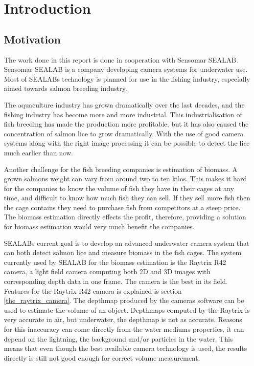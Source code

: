 \section{Introduction}\label{introduction}

\subsection{Motivation}\label{motivation}

The work done in this report is done in cooperation with Sensomar SEALAB.
Sensomar SEALAB is a company developing camera systems for underwater use. Most of SEALABs technology is planned for use in the fishing industry, especially aimed towards salmon breeding industry. 

The aquaculture industry has grown dramatically over the last decades, and the fishing industry has become more and more industrial. This industrialisation of fish breeding has made the production more profitable, but it has also caused the concentration of salmon lice to grow dramatically. With the use of good camera systems along with the right image processing it can be possible to detect the lice much earlier than now. 

Another challenge for the fish breeding companies is estimation of biomass. A grown salmons weight can vary from around two to ten kilos. This makes it hard for the companies to know the volume of fish they have in their cages at any time, and difficult to know how much fish they can sell. If they sell more fish then the cage contains they need to purchase fish from competitors at a steep price. The biomass estimation directly effects the profit, therefore, providing a solution for biomass estimation would very much benefit the companies. 

SEALABs current goal is to develop an advanced underwater camera system that can both detect salmon lice and measure biomass in the fish cages.
The system currently used by SEALAB for the biomass estimation is the Raytrix R42 camera, a light field camera computing both 2D and 3D images with corresponding depth data in one frame. The camera is the best in its field. Features for the Raytrix R42 camera is explained is section \ref{the_raytrix_camera}. 
The depthmap produced by the cameras software can be used to estimate the volume of an object. Depthmaps computed by the Raytrix is very accurate in air, but underwater, the depthmap is not as accurate. Reasons for this inaccuracy can come directly from the water mediums properties, it can depend on the lightning, the background and/or particles in the water. This means that even though the best available camera technology is used, the results directly is still not good enough for correct volume measurement.

